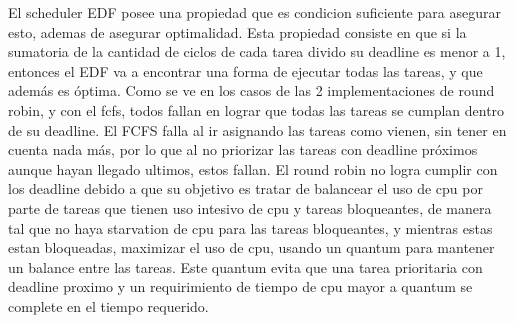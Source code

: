 El scheduler EDF posee una propiedad que es condicion suficiente para asegurar esto, ademas de asegurar optimalidad.
Esta propiedad consiste en que si la sumatoria de la cantidad de ciclos de cada tarea divido su deadline es menor a 1, entonces el EDF va a encontrar una forma de ejecutar todas las tareas, y que además es óptima. Como se ve en los casos de las 2 implementaciones de round robin, y con el fcfs, todos fallan en lograr que todas las tareas se cumplan dentro de su deadline.
El FCFS falla al ir asignando las tareas como vienen, sin tener en cuenta nada más, por lo que al no priorizar las tareas con deadline próximos aunque hayan llegado ultimos, estos fallan.
El round robin no logra cumplir con los deadline debido a que su objetivo es tratar de balancear el uso de cpu por parte de tareas que tienen uso intesivo de cpu y tareas bloqueantes, de manera tal que no haya starvation de cpu para las tareas bloqueantes, y mientras estas estan bloqueadas, maximizar el uso de cpu, usando un quantum para mantener un balance entre las tareas. Este quantum evita que una tarea prioritaria con deadline proximo y un requirimiento de tiempo de cpu mayor a quantum se complete en el tiempo requerido.